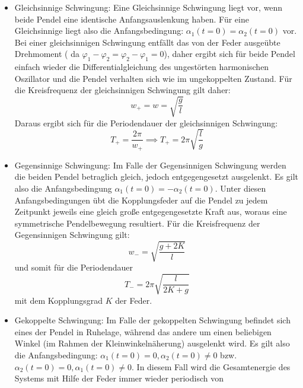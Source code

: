 \begin{itemize}
\item Gleichsinnige Schwingung: \newline
Eine Gleichsinnige Schwingung liegt vor, wenn beide Pendel eine identische Anfangsauslenkung haben. 
Für eine Gleichsinnige liegt also die Anfangsbedingung: $\alpha_1(t=0)=\alpha_2(t=0)$ vor. Bei einer 
gleichsinnigen Schwingung entfällt das von der Feder ausgeübte Drehmoment 
( da $\varphi_1-\varphi_2=\varphi_2-\varphi_1=0$), daher ergibt sich für beide Pendel einfach wieder die 
Differentialgleichung des ungestörten harmonischen Oszillator und die Pendel verhalten sich wie im 
ungekoppelten Zustand. Für die Kreisfrequenz der gleichsinnigen Schwingung gilt daher:
\begin{equation}
    \label{eq:omegaplus}
w_+=w=\sqrt{\frac{g}{l}}
\end{equation}
Daraus ergibt sich für die Periodendauer der gleichsinnigen Schwingung:
\begin{equation}
    \label{eq:tplus}
T_+=\frac{2\pi}{w_+} \implies T_+=2\pi\sqrt{\frac{l}{g}}
\end{equation}
\item Gegensinnige Schwingung: \newline
Im Falle der Gegensinnigen Schwingung werden die beiden Pendel betraglich gleich, jedoch entgegengesetzt ausgelenkt. Es gilt also die Anfangsbedingung $\alpha_1(t=0)=-\alpha_2(t=0)$. Unter diesen Anfangsbedingungen übt die Kopplungsfeder auf die Pendel zu jedem Zeitpunkt jeweils eine gleich große entgegengesetzte Kraft aus, woraus eine symmetrische Pendelbewegung resultiert. Für die Kreisfrequenz der Gegensinnigen Schwingung gilt:
\begin{equation}
    \label{eq:omegaminus}
w_-=\sqrt{\frac{g+2K}{l}}
\end{equation}
und somit für die Periodendauer
\begin{equation}
    \label{eq:tminus}
T_-=2\pi\sqrt{\frac{l}{2K+g}}
\end{equation}
mit dem Kopplungsgrad $K$ der Feder.
\item Gekoppelte Schwingung: \newline
Im Falle der gekoppelten Schwingung befindet sich eines der Pendel in Ruhelage, während das andere um 
einen beliebigen Winkel (im Rahmen der Kleinwinkelnäherung) ausgelenkt wird. Es gilt also die 
Anfangsbedingung: $\alpha_1(t=0)=0,\alpha_2(t=0)\neq0$ bzw. $\alpha_2(t=0)=0,\alpha_1(t=0)\neq0$. 
In diesem Fall wird die Gesamtenergie des Systems mit Hilfe der Feder immer wieder periodisch von 

\end{itemize}
